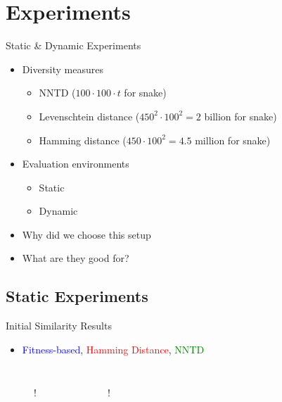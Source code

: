 \section{Experiments}
\begin{frame}{Static \& Dynamic Experiments}
  \begin{itemize}
    \item Diversity measures
      \begin{itemize}
        \item NNTD ($100 \cdot 100 \cdot t$ for snake)
        \item Levenschtein distance ($450^2 \cdot 100^2 = 2$ billion for snake)
        \item Hamming distance ($450 \cdot 100^2 = 4.5$ million for snake) %
      \end{itemize}
    \item Evaluation environments
      \begin{itemize}
        \item Static
        \item Dynamic
      \end{itemize}
    \item Why did we choose this setup
    \item What are they good for?
  \end{itemize}
\end{frame}

\subsection{Static Experiments}

\begin{frame}{Initial Similarity Results}
  \begin{itemize}
    \item \textcolor{blue}{Fitness-based}, \textcolor{red}{Hamming Distance}, \textcolor{green}{NNTD}
  \end{itemize}

  \begin{columns}
    \begin{figure}[t!]
      \centering
      \resizebox{\linewidth} {!} {%
        
      }
    \end{figure}
    \begin{figure}
      \centering
      \resizebox{\linewidth} {!} {%
        
      }
    \end{figure}
  \end{columns}
  
\end{frame}


